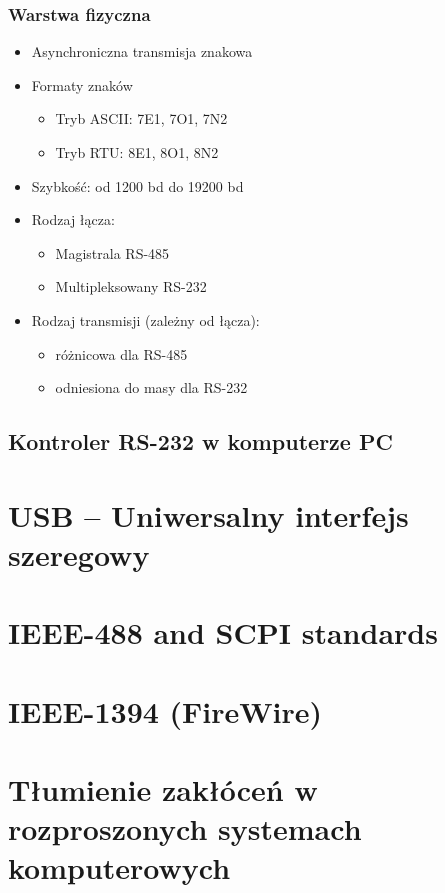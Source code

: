 \documentclass[a4paper,twoside]{article}
\begin{document}
		\subsubsection{Warstwa fizyczna}
		\begin{itemize}
			\item Asynchroniczna transmisja znakowa
			\item Formaty znaków
			\begin{itemize}
				\item Tryb ASCII: 7E1, 7O1, 7N2
				\item Tryb RTU: 8E1, 8O1, 8N2
			\end{itemize}
			\item Szybkość: od 1200 bd do 19200 bd
			\item Rodzaj łącza:
			\begin{itemize}
				\item Magistrala RS-485
				\item Multipleksowany RS-232
			\end{itemize}
			\item Rodzaj transmisji (zależny od łącza):
			\begin{itemize}
				\item różnicowa dla RS-485
				\item odniesiona do masy dla RS-232
			\end{itemize}
		\end{itemize}
	\subsection{Kontroler RS-232 w komputerze PC}
	
\section{USB – Uniwersalny interfejs szeregowy}
\section{IEEE-488 and SCPI standards}
\section{IEEE-1394 (FireWire)}
\section{Tłumienie zakłóceń w rozproszonych systemach komputerowych}
\end{document}
